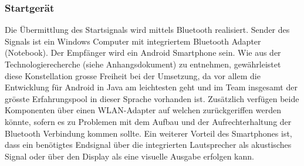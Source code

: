 \subsubsection{Startgerät}
Die Übermittlung des Startsignals wird mittels Bluetooth realisiert. 
Sender des Signals ist ein Windows Computer mit integriertem Bluetooth Adapter (Notebook). Der Empfänger wird ein Android Smartphone sein.
Wie aus der Technologierecherche (siehe Anhangsdokument) zu entnehmen, gewährleistet diese Konstellation grosse Freiheit bei der Umsetzung, 
da vor allem die Entwicklung für Android in Java am leichtesten geht und im Team insgesamt der grösste Erfahrungspool in dieser Sprache vorhanden ist. Zusätzlich verfügen beide Komponenten über einen WLAN-Adapter auf welchen zurückgeriffen werden könnte, sofern es zu Problemen mit dem Aufbau  und der Aufrechterhaltung der Bluetooth Verbindung kommen sollte.
Ein weiterer Vorteil des Smartphones ist, dass ein benötigtes Endsignal über die integrierten Lautsprecher 
als akustisches Signal oder über den Display als eine visuelle Ausgabe erfolgen kann.
